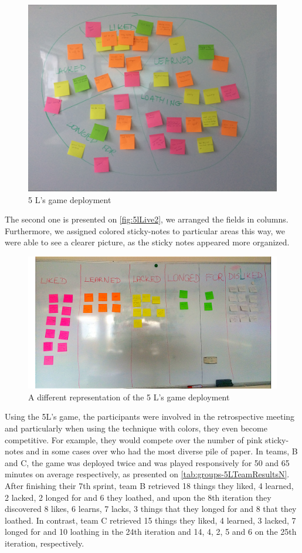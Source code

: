 \begin{figure}[!htbp]
\caption{5 L's game deployment}
\label{fig:5lLive}
\centering
\includegraphics[width=1\textwidth]{live/5lLive}
\end{figure}
The second one is presented on \autoref{fig:5lLive2}, we arranged the fields in columns. Furthermore, we assigned colored sticky-notes to particular areas this way, we were able to see a clearer picture, as the sticky notes appeared more organized.
\begin{figure}[!htbp]
\caption{A different representation of the 5 L’s game deployment}
\label{fig:5lLive2}
\centering
\includegraphics[width=1\textwidth]{live/5lLive2}
\end{figure}

Using the 5L’s game, the participants were involved in the retrospective meeting and particularly when using the technique with colors, they even become competitive. For example, they would compete over the number of pink sticky-notes and in some cases over who had the most diverse pile of paper. In teams, B and C, the game was deployed twice and was played responsively for 50 and 65 minutes on average respectively, as presented on \autoref{tab:groups-5LTeamResultsN}. After finishing their 7th sprint, team B retrieved 18 things they liked, 4 learned, 2 lacked, 2 longed for and 6 they loathed, and upon the 8th iteration they discovered 8 likes, 6 learns, 7 lacks, 3 things that they longed for and 8 that they loathed. In contrast, team C retrieved 15 things they liked, 4 learned, 3 lacked, 7 longed for and 10 loathing in the 24th iteration and 14, 4, 2, 5 and 6 on the 25th iteration, respectively. 


